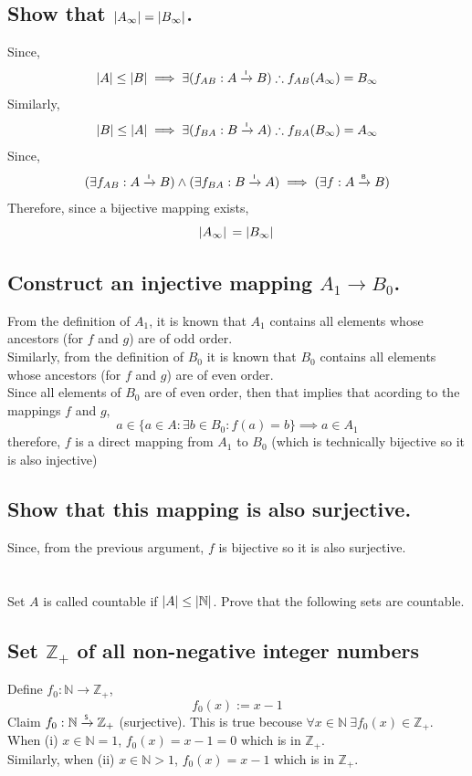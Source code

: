 \documentclass[]{article}
\newcommand{\N}{\mathbb{N}}
\newcommand{\Z}{\mathbb{Z}}
\newcommand{\toI}{\xrightarrow{\textsf{\tiny I}}}
\newcommand{\toS}{\xrightarrow{\textsf{\tiny S}}}
\newcommand{\toB}{\xrightarrow{\textsf{\tiny B}}}
\begin{document}
\subsection{Show that $\abs{A_\infty}=\abs{B_\infty}$.}

Since,
$$\abs{A} \leq \abs{B} \implies \exists (f_{AB} : A \toI B) \therefore f_{AB}(A_\infty) = B_\infty$$
Similarly,
$$\abs{B} \leq \abs{A} \implies \exists (f_{BA} : B \toI A) \therefore f_{BA}(B_\infty) = A_\infty$$
Since,
$$(\exists f_{AB} : A \toI B) \land (\exists f_{BA} : B \toI A) 
\implies (\exists f : A \toB B)$$
Therefore, since a bijective mapping exists,
$$\abs*{A_\infty} = \abs*{B_\infty}$$

\subsection{Construct an injective mapping $A_1 \rightarrow B_0$.}

From the definition of $A_1$,
it is known that $A_1$ contains all elements whose ancestors (for $f$ and $g$) are of odd order.\\
Similarly, from the definition of $B_0$ it is known that $B_0$ contains all elements whose 
ancestors (for $f$ and $g$) are of even order.\\
Since all elements of $B_0$ are of even order, then that implies that acording to the mappings
$f$ and $g$, $$a \in \{a \in A : \exists b \in B_0 : f(a) = b\} \implies a \in A_1$$
therefore, $f$ is a direct mapping from $A_1$ to $B_0$ 
(which is technically bijective so it is also injective)

\subsection{Show that this mapping is also surjective.}
Since, from the previous argument, $f$ is bijective so it is also surjective.


\newpage
\section{}
Set $A$ is called countable if $\abs{A} \leq \abs{\N}$.
Prove that the following sets are countable.

\subsection{Set $\Z_+$ of all non-negative integer numbers}
Define $f_0 : \N \to \Z_+$, 
\begin{displaymath}
	f_0(x) := x - 1
\end{displaymath}
Claim $f_0 : \N \toS \Z_+$ (surjective).
This is true becouse $\forall x \in \N \ \exists f_0(x) \in \Z_+$.\\
When (i) $x \in \N = 1$, $f_0(x) = x - 1 = 0$ which is in $\Z_+$.\\
Similarly, when (ii) $x \in \N > 1$, $f_0(x) = x - 1$ which is in $\Z_+$.\\
\end{document}

